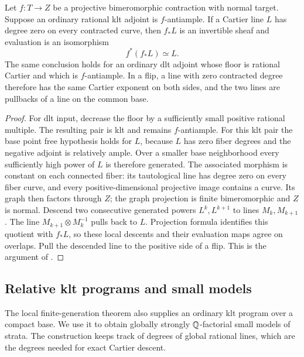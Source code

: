 \begin{lemma}
\label{prog:integral-descent}
Let \(f:T\to Z\) be a projective bimeromorphic contraction with normal
target.  Suppose an ordinary rational klt adjoint is \(f\)-antiample.
If a Cartier line \(L\) has degree zero on every contracted curve,
then \(f_*L\) is an invertible sheaf and evaluation is an isomorphism
\[
 f^*(f_*L)\simeq L.
\]
The same conclusion holds for an ordinary dlt adjoint whose floor is
rational Cartier and which is \(f\)-antiample.  In a flip, a line with
zero contracted degree therefore has the same Cartier exponent on
both sides, and the two lines are pullbacks of a line on the common
base.
\end{lemma}

\begin{proof}
For dlt input, decrease the floor by a sufficiently small positive
rational multiple.  The resulting pair is klt and remains
\(f\)-antiample.  For this klt pair the base point free hypothesis
holds for \(L\), because \(L\) has zero fiber degrees and the negative
adjoint is relatively ample.  Over a smaller base neighborhood every
sufficiently high power of \(L\) is therefore generated.  The
associated morphism is constant on each connected fiber: its
tautological line has degree zero on every fiber curve, and every
positive-dimensional projective image contains a curve.  Its graph
then factors through \(Z\); the graph projection is finite
bimeromorphic and \(Z\) is normal. Descend two consecutive generated
powers \(L^k,L^{k+1}\) to lines \(M_k,M_{k+1}\). The line
\(M_{k+1}\otimes M_k^{-1}\) pulls back to \(L\). Projection formula
identifies this quotient with
\(f_*L\), so these local descents and their evaluation maps agree on
overlaps.  Pull the descended line to the positive side of a flip.
This is the argument of \cite[Lemma~7.4]{CB}.
\end{proof}

\subsection{Relative klt programs and small models}

The local finite-generation theorem also supplies an ordinary klt program
over a compact base. We use it to obtain globally strongly
\(\mathbb Q\)-factorial small models of strata. The construction keeps track of
degrees of global rational lines, which are the degrees needed for exact
Cartier descent.

